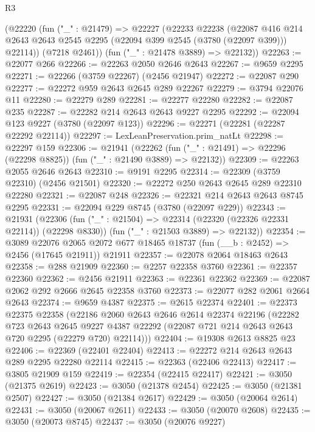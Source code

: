 \begin{lexlean}{R3}
\begin{coremodule}
    (@22220
      (fun ("_" : @21479) =>
      @22227
        (@22233
          @22238
          (@22087
            @416
            @214
            @2643
            @2643
            @2545
            @2295
            (@22094 @399 @2545 (@3780 (@22097 @399)))
            @22114))
        (@7218 @2461))
      (fun ("_" : @21478 @3889) => @22132))
@22263 := @22077 @266
@22266 := @22263 @2050 @2646 @2643
@22267 := @9659 @2295
@22271 := @22266 (@3759 @22267) (@2456 @21947)
@22272 := @22087 @290
@22277 := @22272 @959 @2643 @2645 @289 @22267
@22279 := @3794 @22076 @11
@22280 := @22279 @289
@22281 := @22277 @22280
@22282 := @22087 @235
@22287 := @22282 @214 @2643 @2643 @9227 @2295
@22292 := @22094 @123 @9227 (@3780 (@22097 @123))
@22296 := @22271 (@22281 (@22287 @22292 @22114))
@22297 := LexLeanPreservation.prim_natLt
@22298 := @22297 @159
@22306 := @21941
    (@22262 (fun ("_" : @21491) => @22296 (@22298 @8825)) (fun ("_" : @21490 @3889) => @22132))
@22309 := @22263 @2055 @2646 @2643
@22310 := @9191 @2295
@22314 := @22309 (@3759 @22310) (@2456 @21501)
@22320 := @22272 @250 @2643 @2645 @289 @22310 @22280
@22321 := @22087 @248
@22326 := @22321 @214 @2643 @2643 @8745 @2295
@22331 := @22094 @229 @8745 (@3780 (@22097 @229))
@22343 := @21931
    (@22306
      (fun ("_" : @21504) => @22314 (@22320 (@22326 @22331 @22114)) (@22298 @8330))
      (fun ("_" : @21503 @3889) => @22132))
@22354 := @3089
    @22076
    @2065
    @2072
    @677
    @18465
    @18737
    (fun (__b : @2452) => @2456 (@17645 @21911))
    @21911
@22357 := @22078 @2064 @18463 @2643
@22358 := @288 @21909
@22360 := @2257 @22358 @3760
@22361 := @22357 @22360
@22362 := @2456 @21911
@22363 := @22361 @22362
@22369 := @22087 @2062 @292 @2666 @2645 @22358 @3760
@22373 := @22077 @282 @2061 @2664 @2643
@22374 := @9659 @4387
@22375 := @2615 @22374
@22401 := @22373
    @22375
    @22358
    (@22186
      @2060
      @2643
      @2646
      @2614
      @22374
      @22196
      (@22282
        @723
        @2643
        @2645
        @9227
        @4387
        @22292
        (@22087 @721 @214 @2643 @2643 @720 @2295 (@22279 @720) @22114)))
@22404 := @19308 @2613 @8825 @23
@22406 := @22369 (@22401 @22404)
@22413 := @22272 @214 @2643 @2643 @289 @2295 @22280 @22114
@22415 := @22363 (@22406 @22413)
@22417 := @3805 @21909 @159
@22419 := @22354 (@22415 @22417)
@22421 := @3050 (@21375 @2619)
@22423 := @3050 (@21378 @2454)
@22425 := @3050 (@21381 @2507)
@22427 := @3050 (@21384 @2617)
@22429 := @3050 (@20064 @2614)
@22431 := @3050 (@20067 @2611)
@22433 := @3050 (@20070 @2608)
@22435 := @3050 (@20073 @8745)
@22437 := @3050 (@20076 @9227)

\end{coremodule}
\end{lexlean}
